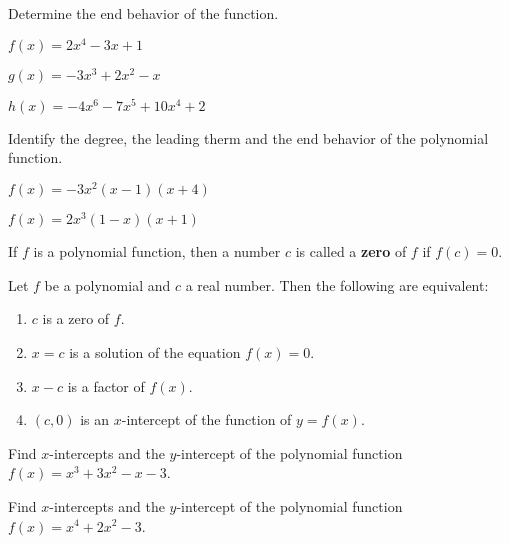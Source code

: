 \begin{example}
  Determine the end behavior of the function.\\
  \begin{enumerate*}
    \item $f(x)=2x^4-3x+1$
    \item $g(x)=-3x^3+2x^2-x$
    \item $h(x)=-4x^6-7x^5+10x^4+2$\hfill\null
  \end{enumerate*}
\end{example}

\begin{example}
  Identify the degree, the leading therm and the end behavior of the polynomial function.\\
  \begin{enumerate*}
    \item $f(x)=-3x^2(x-1)(x+4)$
    \item $f(x)=2x^3(1-x)(x+1)$\hfill\null
  \end{enumerate*}
\end{example}

\newpage

\begin{definition}
  If $f$ is a polynomial function, then a number $c$ is called a \textbf{zero} of $f$ if $f(c)=0$.
\end{definition}

\begin{proposition}
  Let $f$ be a polynomial and $c$ a real number. Then the following are equivalent:
  \begin{enumerate}
    \item $c$ is a zero of $f$.
    \item $x=c$ is a solution of the equation $f(x)=0$.
    \item $x-c$ is a factor of $f(x)$.
    \item $(c,0)$ is an $x$-intercept of the function of $y=f(x)$.
  \end{enumerate}
\end{proposition}

\begin{example}
  Find $x$-intercepts and the $y$-intercept of the polynomial function $f(x)=x^{3} + 3 x^{2} - x - 3$.
\end{example}

\begin{example}
  Find $x$-intercepts and the $y$-intercept of the polynomial function $f(x)=x^4+2x^2-3$.
\end{example}

